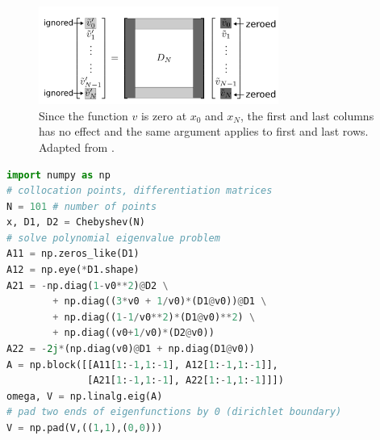 \begin{figure} [htpb]
	\centering
	\includegraphics[width=0.7\textwidth]{figures/chebyshev-differentiation-dirichlet.png}
	\caption{Since the function $v$ is zero at $x_0$ and  $x_N$, the first and last columns has no effect and the same argument applies to first and last rows. Adapted from \cite{trefethen_spectral_2000}.}
	\label{fig:chebyshev-differentiation-dirichlet}
\end{figure}


\begin{lstlisting}[language=Python, float, floatplacement=H, caption={Pseudocode for solving polynomial eigenvalue problem using spectral collocation with Dirichlet boundary condition.}, label=code:spectral-collocation-dirichlet]
import numpy as np
# collocation points, differentiation matrices	
N = 101 # number of points
x, D1, D2 = Chebyshev(N) 
# solve polynomial eigenvalue problem
A11 = np.zeros_like(D1)
A12 = np.eye(*D1.shape)
A21 = -np.diag(1-v0**2)@D2 \
        + np.diag((3*v0 + 1/v0)*(D1@v0))@D1 \
        + np.diag((1-1/v0**2)*(D1@v0)**2) \
        + np.diag((v0+1/v0)*(D2@v0)) 
A22 = -2j*(np.diag(v0)@D1 + np.diag(D1@v0))
A = np.block([[A11[1:-1,1:-1], A12[1:-1,1:-1]],
              [A21[1:-1,1:-1], A22[1:-1,1:-1]]])
omega, V = np.linalg.eig(A)
# pad two ends of eigenfunctions by 0 (dirichlet boundary)
V = np.pad(V,((1,1),(0,0)))
\end{lstlisting}

